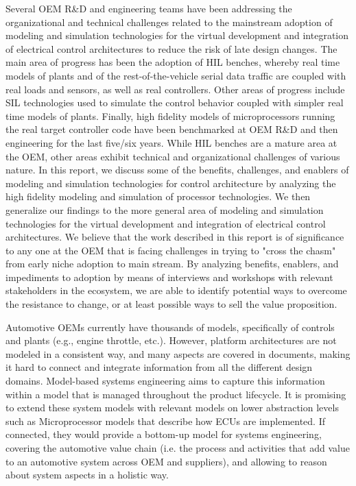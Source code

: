 Several OEM R\&D and engineering teams have been addressing the organizational and technical challenges related to the mainstream adoption of modeling and simulation technologies for the virtual development and integration of electrical control architectures to reduce the risk of late design changes. The main area of progress has been the adoption of HIL benches, whereby real time models of plants and of the rest-of-the-vehicle serial data traffic are coupled with real loads and sensors, as well as real controllers. Other areas of progress include SIL technologies used to simulate the control behavior coupled with simpler real time models of plants. Finally, high fidelity models of microprocessors running the real target controller code have been benchmarked at OEM R\&D and then engineering for the last five/six years. While HIL benches are a mature area at the OEM, other areas exhibit technical and organizational challenges of various nature. In this report, we discuss some of the benefits, challenges, and enablers of modeling and simulation technologies for control architecture by analyzing the high fidelity modeling and simulation of processor technologies. We then generalize our findings to the more general area of modeling and simulation technologies for the virtual development and integration of electrical control architectures. We believe that the work described in this report is of significance to any one at the OEM that is facing challenges in trying to "cross the chasm" from early niche adoption to main stream. By analyzing benefits, enablers, and impediments to adoption by means of interviews and workshops with relevant stakeholders in the ecosystem, we are able to identify potential ways to overcome the resistance to change, or at least possible ways to sell the value proposition.

Automotive OEMs currently have thousands of models, specifically of controls and plants (e.g., engine throttle, etc.). However, platform architectures are not modeled in a consistent way, and many aspects are covered in documents, making it hard to connect and integrate information from all the different design domains. Model-based systems engineering aims to capture this information within a model that is managed throughout the product lifecycle. It is promising to extend these system models with relevant models on lower abstraction levels such as Microprocessor models that describe how ECUs are implemented. If connected, they would provide a bottom-up model for systems engineering, covering the automotive value chain (i.e. the process and activities that add value to an automotive system across OEM and suppliers), and allowing to reason about system aspects in a holistic way.

